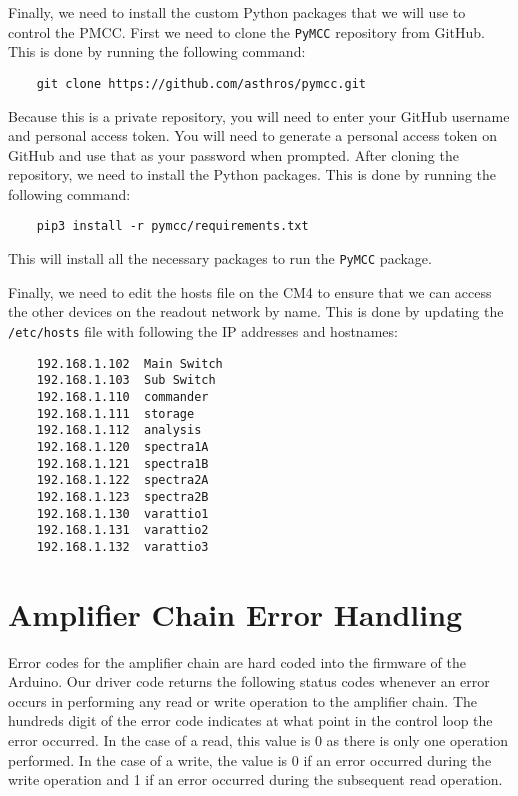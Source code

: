 Finally, we need to install the custom Python packages that we will use to control the PMCC.
First we need to clone the \texttt{PyMCC} repository from GitHub.
This is done by running the following command:
\begin{verbatim}
    git clone https://github.com/asthros/pymcc.git
\end{verbatim}
Because this is a private repository, you will need to enter your GitHub username and personal access token.
You will need to generate a personal access token on GitHub and use that as your password when prompted.
After cloning the repository, we need to install the Python packages.
This is done by running the following command:
\begin{verbatim}
    pip3 install -r pymcc/requirements.txt
\end{verbatim}
This will install all the necessary packages to run the \texttt{PyMCC} package.

Finally, we need to edit the hosts file on the CM4 to ensure that we can access the other devices on the readout network by name.
This is done by updating the \texttt{/etc/hosts} file with following the IP addresses and hostnames:
\begin{verbatim}
    192.168.1.102  Main Switch
    192.168.1.103  Sub Switch
    192.168.1.110  commander
    192.168.1.111  storage
    192.168.1.112  analysis
    192.168.1.120  spectra1A
    192.168.1.121  spectra1B
    192.168.1.122  spectra2A
    192.168.1.123  spectra2B
    192.168.1.130  varattio1
    192.168.1.131  varattio2
    192.168.1.132  varattio3
\end{verbatim}

\chapter{Amplifier Chain Error Handling}
\label{readout/app:if_amp_errors}
Error codes for the amplifier chain are hard coded into the firmware of the Arduino.
Our driver code returns the following status codes whenever an error occurs in performing any read or write operation to the amplifier chain.
The hundreds digit of the error code indicates at what point in the control loop the error occurred.
In the case of a read, this value is 0 as there is only one operation performed.
In the case of a write, the value is 0 if an error occurred during the write operation and 1 if an error occurred during the subsequent read operation.

